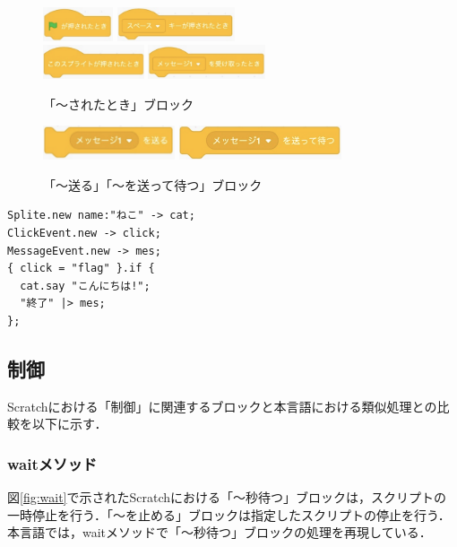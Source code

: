 \documentclass[10pt,a4j]{ltjsarticle}
\begin{document}
\begin{figure}[H]
  \centering
  \includegraphics[height=10mm]{images/flag.pdf} 
  \includegraphics[height=10mm]{images/keypress.pdf} \\
  \includegraphics[height=10mm]{images/click.pdf} 
  \includegraphics[height=10mm]{images/message.pdf}
  \caption{「〜されたとき」ブロック}
  \label{fig:then}
\end{figure}

\begin{figure}[H]
  \centering
  \includegraphics[height=10mm]{images/send.pdf} 
  \includegraphics[height=10mm]{images/send2.pdf} 
  \caption{「〜送る」「〜を送って待つ」ブロック}
  \label{fig:send}
\end{figure}

\begin{lstlisting}[caption=イベント処理のプログラム例, label=code26]
Splite.new name:"ねこ" -> cat;
ClickEvent.new -> click;
MessageEvent.new -> mes;
{ click = "flag" }.if {
  cat.say "こんにちは!";
  "終了" |> mes;
};
\end{lstlisting}

\subsection{制御}
Scratchにおける「制御」に関連するブロックと本言語における類似処理との比較を以下に示す．
\subsubsection{waitメソッド}
図\ref{fig:wait}で示されたScratchにおける「〜秒待つ」ブロックは，スクリプトの一時停止を行う．「〜を止める」ブロックは指定したスクリプトの停止を行う．本言語では，waitメソッドで「〜秒待つ」ブロックの処理を再現している．
\end{document}
